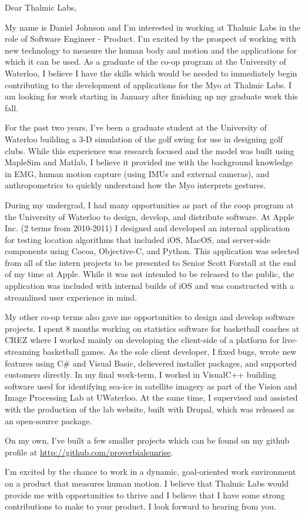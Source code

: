 Dear Thalmic Labs, 

My name is Daniel Johnson and I'm interested in working at Thalmic Labs in the role of Software Engineer - Product.  I'm excited by the prospect of working with new technology to measure the human body and motion and the applications for which it can be used.  As a graduate of the co-op program at the University of Waterloo, I believe I have the skills which would be needed to immediately begin contributing to the development of applications for the Myo at Thalmic Labs.  I am looking for work starting in January after finishing up my graduate work this fall.  

For the past two years, I've been a graduate student at the University of Waterloo building a 3-D simulation of the golf swing for use in designing golf clubs.  While this experience was research focused and the model was built using MapleSim and Matlab, I believe it provided me with the background knowledge in EMG, human motion capture (using IMUs and external cameras), and anthropometrics to quickly understand how the Myo interprets gestures. 

During my undergrad, I had many opportunities as part of the coop program at the University of Waterloo to design, develop, and distribute software.  At Apple Inc. (2 terms from 2010-2011) I designed and developed an internal application for testing location algorithms that included iOS, MacOS, and server-side components using Cocoa, Objective-C, and Python.  This application was selected from all of the intern projects to be presented to Senior Scott Forstall at the end of my time at Apple. While it was not intended to be released to the public, the application was included with internal builds of iOS and was constructed with a streamlined user experience in mind.  

My other co-op terms also gave me opportunities to design and develop software projects.  I spent 8 months working on statistics software for basketball coaches at CREZ where I worked mainly on developing the client-side of a platform for live-streaming basketball games. As the sole client developer, I fixed bugs, wrote new features using C\# and Visual Basic, delievered installer packages, and supported customers directly.  In my final work-term, I worked in VisualC++ building software used for identifying sea-ice in satellite imagery as part of the Vision and Image Processing Lab at UWaterloo.  At the same time, I supervised and assisted with the production of the lab website, built with Drupal, which was released as an open-source package.  

On my own, I've built a few smaller projects which can be found on my github profile at \url{http://github.com/proverbialsunrise}.  

I'm excited by the chance to work in a dynamic, goal-oriented work environment on a product that measures human motion.  I believe that Thalmic Labs would provide me with opportunities to thrive and I believe that I have some strong contributions to make to your product.  I look forward to hearing from you. 

